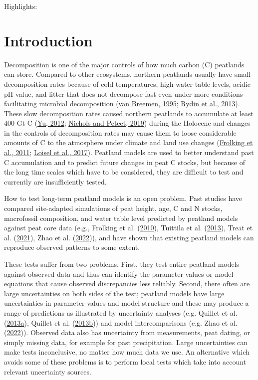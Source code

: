 \documentclass[
  12pt,
]{article}
\begin{document}
Highlights:

\hypertarget{introduction}{%
\section{Introduction}\label{introduction}}

Decomposition is one of the major controls of how much carbon (C) peatlands can store. Compared to other ecosystems, northern peatlands usually have small decomposition rates because of cold temperatures, high water table levels, acidic pH value, and litter that does not decompose fast even under more conditions facilitating microbial decomposition (\protect\hyperlink{ref-vanBreemen.1995}{van Breemen, 1995}; \protect\hyperlink{ref-Rydin.2013}{Rydin et al., 2013}). These slow decomposition rates caused northern peatlands to accumulate at least 400 Gt C (\protect\hyperlink{ref-Yu.2012}{Yu, 2012}; \protect\hyperlink{ref-Nichols.2019}{Nichols and Peteet, 2019}) during the Holocene and changes in the controls of decomposition rates may cause them to loose considerable amounts of C to the atmosphere under climate and land use changes (\protect\hyperlink{ref-Frolking.2011}{Frolking et al., 2011}; \protect\hyperlink{ref-Loisel.2017}{Loisel et al., 2017}). Peatland models are used to better understand past C accumulation and to predict future changes in peat C stocks, but because of the long time scales which have to be considered, they are difficult to test and currently are insufficiently tested.

How to test long-term peatland models is an open problem. Past studies have compared site-adapted simulations of peat height, age, C and N stocks, macrofossil composition, and water table level predicted by peatland models against peat core data (e.g., Frolking et al. (\protect\hyperlink{ref-Frolking.2010}{2010}), Tuittila et al. (\protect\hyperlink{ref-Tuittila.2013}{2013}), Treat et al. (\protect\hyperlink{ref-Treat.2021}{2021}), Zhao et al. (\protect\hyperlink{ref-Zhao.2022}{2022})), and have shown that existing peatland models can reproduce observed patterns to some extent.

These tests suffer from two problems. First, they test entire peatland models against observed data and thus can identify the parameter values or model equations that cause observed discrepancies less reliably. Second, there often are large uncertainties on both sides of the test; peatland models have large uncertainties in parameter values and model structure and these may produce a range of predictions as illustrated by uncertainty analyses (e.g. Quillet et al. (\protect\hyperlink{ref-Quillet.2013}{2013a}), Quillet et al. (\protect\hyperlink{ref-Quillet.2013a}{2013b})) and model intercomparisons (e.g. Zhao et al. (\protect\hyperlink{ref-Zhao.2022}{2022})). Observed data also has uncertainty from measurements, peat dating, or simply missing data, for example for past precipitation. Large uncertainties can make tests inconclusive, no matter how much data we use. An alternative which avoids some of these problems is to perform local tests which take into account relevant uncertainty sources.
\end{document}
